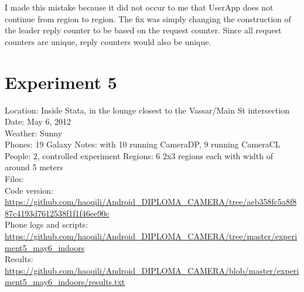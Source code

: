 I made this mistake because it did not occur to me that UserApp does not continue from region to region. The fix was simply changing the construction of the leader reply counter to be based on the request counter. Since all request counters are unique, reply counters would also be unique.

\section{Experiment 5}

Location: Inside Stata, in the lounge closest to the Vassar/Main St intersection\\
Date: May 6, 2012\\
Weather: Sunny\\
Phones: 19 Galaxy Notes: with 10 running CameraDP, 9 running CameraCL\\
People: 2, controlled experiment
Regions: 6 2x3 regions each with width of around 5 meters\\
Files:\\
Code version: {\url{https://github.com/haoqili/Android_DIPLOMA_CAMERA/tree/aeb358fc5a8f887c4193d7612538f1f1f46ee90c}}\\
Phone logs and scripts: {\url{https://github.com/haoqili/Android_DIPLOMA_CAMERA/tree/master/experiment5_may6_indoors}}\\ 
Results: {\url{https://github.com/haoqili/Android_DIPLOMA_CAMERA/blob/master/experiment5_may6_indoors/results.txt}}\\

